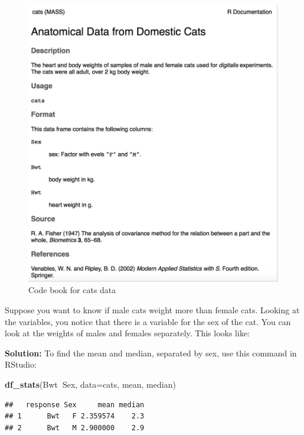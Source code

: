 \documentclass[
]{book}
\newenvironment{Shaded}{\begin{snugshade}}{\end{snugshade}}
\newcommand{\DataTypeTok}[1]{\textcolor[rgb]{0.13,0.29,0.53}{#1}}
\newcommand{\KeywordTok}[1]{\textcolor[rgb]{0.13,0.29,0.53}{\textbf{#1}}}
\newcommand{\NormalTok}[1]{#1}
\newcommand{\OperatorTok}[1]{\textcolor[rgb]{0.81,0.36,0.00}{\textbf{#1}}}
\begin{document}
\begin{figure}
\centering
\includegraphics{code_book_cats.jpg}
\caption{Code book for cats data}
\end{figure}

Suppose you want to know if male cats weight more than female cats. Looking at the variables, you notice that there is a variable for the sex of the cat. You can look at the weights of males and females separately. This looks like:

\textbf{Solution:}
To find the mean and median, separated by sex, use this command in RStudio:

\begin{Shaded}
\begin{Highlighting}[]
\KeywordTok{df_stats}\NormalTok{(Bwt}\OperatorTok{~}\NormalTok{Sex, }\DataTypeTok{data=}\NormalTok{cats, mean, median)}
\end{Highlighting}
\end{Shaded}

\begin{verbatim}
##   response Sex     mean median
## 1      Bwt   F 2.359574    2.3
## 2      Bwt   M 2.900000    2.9
\end{verbatim}
\end{document}
